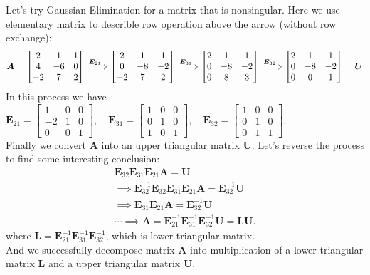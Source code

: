 \begin{example}
Let’s try Gaussian Elimination for a matrix that is nonsingular. Here we use elementary matrix to describle row operation above the arrow (without row exchange):
\[
\bm A=\begin{bmatrix}
2&1&1\\4&-6&0\\-2&7&2
\end{bmatrix}\xLongrightarrow{\bm E_{21}}
\begin{bmatrix}
2&1&1\\0&-8&-2\\-2&7&2
\end{bmatrix}\xLongrightarrow{\bm E_{31}}
\begin{bmatrix}
2&1&1\\0&-8&-2\\0&8&3
\end{bmatrix}\xLongrightarrow{\bm E_{32}}
\begin{bmatrix}
2&1&1\\0&-8&-2\\0&0&1
\end{bmatrix}=\bm U
\]
In this process we have $\bm E_{21}=\begin{bmatrix}
1&0&0\\-2&1&0\\0&0&1
\end{bmatrix},\quad\bm E_{31}=\begin{bmatrix}
1&0&0\\0&1&0\\1&0&1
\end{bmatrix},\quad\bm E_{32}=\begin{bmatrix}
1&0&0\\0&1&0\\0&1&1
\end{bmatrix}$.\\
Finally we convert $\bm A$ into an upper triangular matrix $\bm U$. Let’s reverse the process to find some interesting conclusion:
\begin{gather*}
\bm E_{32}\bm E_{31}\bm E_{21}\bm A=\bm U\\
\implies
\bm E_{32}^{-1}\bm E_{32}\bm E_{31}\bm E_{21}\bm A=\bm E_{32}^{-1}\bm U\\
\implies
\bm E_{31}\bm E_{21}\bm A=\bm E_{32}^{-1}\bm U\\
\cdots\implies
\bm A=\bm E_{21}^{-1}\bm E_{31}^{-1}\bm E_{32}^{-1}\bm U=\bm{LU}.
\end{gather*}
where $\bm L=\bm E_{21}^{-1}\bm E_{31}^{-1}\bm E_{32}^{-1}$, which is lower triangular matrix.\\
And we successfully decompose matrix $\bm A$ into multiplication of a lower triangular matrix $\bm L$
and a upper triangular matrix $\bm U$.
\end{example}
